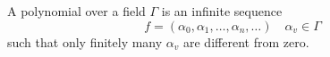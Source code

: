 A polynomial over a field $\Gamma$ is an infinite sequence
$$f = (\alpha_0, \alpha_1, \ldots, \alpha_n, \ldots) \quad \alpha_v \in \Gamma$$
such that only finitely many $\alpha_v$ are different from zero.
